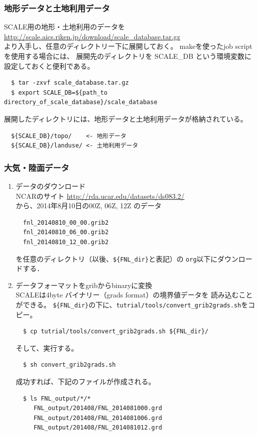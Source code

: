 \subsubsection{地形データと土地利用データ}

SCALE用の地形・土地利用のデータを\\
 \url{http://scale.aics.riken.jp/download/scale_database.tar.gz}\\
より入手し、任意のディレクトリー下に展開しておく。
makeを使ったjob scriptを使用する場合には、
展開先のディレクトリを SCALE\_DB という環境変数に設定しておくと便利である。
\begin{verbatim}
  $ tar -zxvf scale_database.tar.gz
  $ export SCALE_DB=${path_to directory_of_scale_database}/scale_database
\end{verbatim}
展開したディレクトリには、地形データと土地利用データが格納されている。
\begin{verbatim}
  ${SCALE_DB}/topo/    <- 地形データ
  ${SCALE_DB}/landuse/ <- 土地利用データ
\end{verbatim}


\subsubsection{大気・陸面データ}
\begin{enumerate}
\item データのダウンロード\\
NCARのサイト
 \url{http://rda.ucar.edu/datasets/ds083.2/}\\
から、2014年8月10日の00Z, 06Z, 12Z のデータ
\begin{verbatim}
  fnl_20140810_00_00.grib2
  fnl_20140810_06_00.grib2
  fnl_20140810_12_00.grib2
\end{verbatim}
を任意のディレクトリ（以後、\verb|${FNL_dir}|と表記）の
\verb|org|以下にダウンロードする．

\item データフォーマットをgribからbinaryに変換\\
SCALEは4byte バイナリー（grads format）の境界値データを
読み込むことができる。
\verb|${FNL_dir}|の下に、\verb|tutrial/tools/convert_grib2grads.sh|をコピー。
\begin{verbatim}
  $ cp tutrial/tools/convert_grib2grads.sh ${FNL_dir}/
\end{verbatim}
そして、実行する。
\begin{verbatim}
  $ sh convert_grib2grads.sh
\end{verbatim}
成功すれば、下記のファイルが作成される。
\begin{verbatim}
  $ ls FNL_output/*/*
     FNL_output/201408/FNL_2014081000.grd
     FNL_output/201408/FNL_2014081006.grd
     FNL_output/201408/FNL_2014081012.grd
\end{verbatim}
\end{enumerate}


